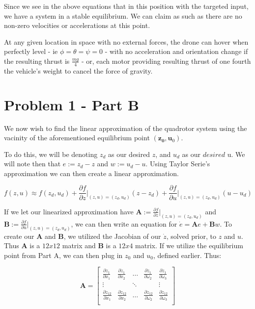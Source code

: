 \documentclass{article}
\begin{document}
Since we see in the above equations that in this position with the targeted input, we have a system in a stable equilibrium. We can claim as such as there are no non-zero velocities or accelerations at this point.

At any given location in space with no external forces, the drone can hover when perfectly level - ie $\phi=\theta=\psi=0$ - with no acceleration and orientation change if the resulting thrust is $\frac{mg}{4}$ - or, each motor providing resulting thrust of one fourth the vehicle's weight to cancel the force of gravity.

\section*{Problem 1 - Part B}

We now wish to find the linear approximation of the quadrotor system using the vacinity of the aforementioned equilibrium point $(\boldsymbol{z_0}, \boldsymbol{u}_0)$.

To do this, we will be denoting $z_d$ as our desired $z$, and $u_d$ as our $desired$ u. We will note then that $e := z_d - z$ and $w := u_d - u$. Using Taylor Serie's approximation we can then create a linear approximation.

\begin{equation}
    f(z, u) \approx f(z_d, u_d) + \frac{\partial f}{\partial z} \Big|_{(z,u)=(z_d, u_d)}(z-z_d) + \frac{\partial f}{\partial u} \Big|_{(z,u)=(z_d,u_d)}(u-u_d)
\end{equation}

If we let our linearized approximation have $\boldsymbol{A} := \frac{\partial f}{\partial z} \Big|_{(z,u)=(z_d, u_d)}$ and $\boldsymbol{B} := \frac{\partial f}{\partial u} \Big|_{(z,u)=(z_d,u_d)}$, we can then write an equation for $\dot{e} = \boldsymbol{A}e + \boldsymbol{B}w$. To create our $\boldsymbol{A}$ and $\boldsymbol{B}$, we utilized the Jacobian of our $\dot{z}$, solved prior, to $z$ and $u$. Thus $\boldsymbol{A}$ is a $12x12$ matrix and $\boldsymbol{B}$ is a $12x4$ matrix. If we utilize the equilibrium point from Part A, we can then plug in $z_0$ and $u_0$, defined earlier. Thus:

\begin{equation}
    \boldsymbol{A} = \begin{bmatrix}
        \frac{\partial \dot{z}_1}{\partial{x_1}} & \frac{\partial \dot{z}_1}{\partial{x_2}} & \ldots & \frac{\partial \dot{z}_1}{\partial \omega_2} & \frac{\partial \dot{z}_1}{\partial \omega_3} \\
        \vdots & & \ddots & & \vdots \\
        \frac{\partial \dot{z}_{12}}{\partial{x_1}} & \frac{\partial \dot{z}_{12}}{\partial{x_2}} & \ldots & \frac{\partial \dot{z}_{12}}{\partial \omega_2} & \frac{\partial \dot{z}_{12}}{\partial \omega_3} \\
    \end{bmatrix}
\end{equation}
\end{document}
